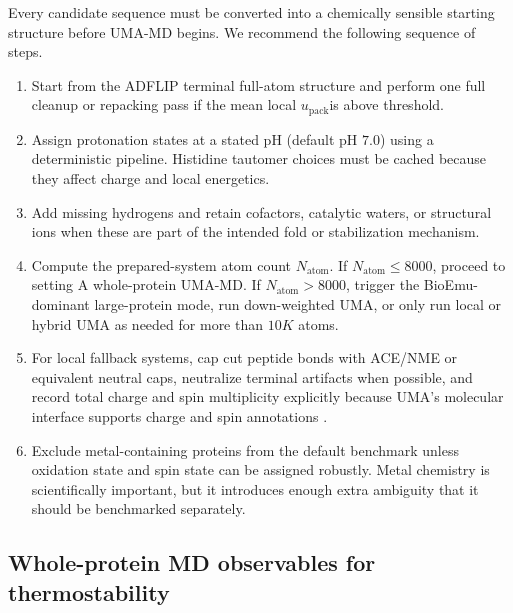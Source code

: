 \documentclass[11pt]{article}
\newcommand{\packunc}{\ensuremath{u_{\mathrm{pack}}}}
\begin{document}
Every candidate sequence must be converted into a chemically sensible starting structure before UMA-MD begins. We recommend the following sequence of steps.
\begin{enumerate}[leftmargin=1.5em]
    \item Start from the ADFLIP terminal full-atom structure and perform one full cleanup or repacking pass if the mean local \packunc is above threshold.
    \item Assign protonation states at a stated pH (default pH $7.0$) using a deterministic pipeline. Histidine tautomer choices must be cached because they affect charge and local energetics.
    \item Add missing hydrogens and retain cofactors, catalytic waters, or structural ions when these are part of the intended fold or stabilization mechanism.
    \item Compute the prepared-system atom count $N_{\mathrm{atom}}$. If $N_{\mathrm{atom}}\leq 8000$, proceed to setting A whole-protein UMA-MD. If $N_{\mathrm{atom}}>8000$, trigger the BioEmu-dominant large-protein mode, run down-weighted UMA, or only run local or hybrid UMA as needed for more than $10K$ atoms. 
    \item For local fallback systems, cap cut peptide bonds with ACE/NME or equivalent neutral caps, neutralize terminal artifacts when possible, and record total charge and spin multiplicity explicitly because UMA's molecular interface supports charge and spin annotations \citep{fairchem2025github}.
    \item Exclude metal-containing proteins from the default benchmark unless oxidation state and spin state can be assigned robustly. Metal chemistry is scientifically important, but it introduces enough extra ambiguity that it should be benchmarked separately.
\end{enumerate}

\subsection{Whole-protein MD observables for thermostability}
\end{document}
